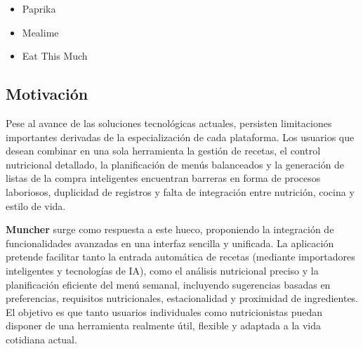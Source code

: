 \begin{itemize}
	\item Paprika
	\item Mealime
	\item Eat This Much
\end{itemize}

\subsection*{Motivación}

Pese al avance de las soluciones tecnológicas actuales, persisten limitaciones importantes derivadas de la especialización de cada plataforma. Los usuarios que desean combinar en una sola herramienta la gestión de recetas, el control nutricional detallado, la planificación de menús balanceados y la generación de listas de la compra inteligentes encuentran barreras en forma de procesos laboriosos, duplicidad de registros y falta de integración entre nutrición, cocina y estilo de vida.

\textbf{Muncher} surge como respuesta a este hueco, proponiendo la integración de funcionalidades avanzadas en una interfaz sencilla y unificada. La aplicación pretende facilitar tanto la entrada automática de recetas (mediante importadores inteligentes y tecnologías de IA), como el análisis nutricional preciso y la planificación eficiente del menú semanal, incluyendo sugerencias basadas en preferencias, requisitos nutricionales, estacionalidad y proximidad de ingredientes. El objetivo es que tanto usuarios individuales como nutricionistas puedan disponer de una herramienta realmente útil, flexible y adaptada a la vida cotidiana actual.
